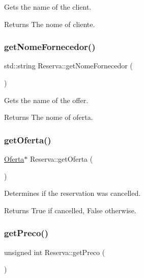 Gets the name of the client. 

\begin{DoxyReturn}{Returns}
The nome of cliente. 
\end{DoxyReturn}
\mbox{\label{classReserva_ad54ef5f67fa096e711d2ab526db30bf3}} 
\subsubsection{\texorpdfstring{get\+Nome\+Fornecedor()}{getNomeFornecedor()}}
{\footnotesize\ttfamily std\+::string Reserva\+::get\+Nome\+Fornecedor (\begin{DoxyParamCaption}{ }\end{DoxyParamCaption})\hspace{0.3cm}{\ttfamily [inline]}}



Gets the name of the offer. 

\begin{DoxyReturn}{Returns}
The nome of oferta. 
\end{DoxyReturn}
\mbox{\label{classReserva_ac7fb69d14f442f58961bd337267bd92d}} 
\subsubsection{\texorpdfstring{get\+Oferta()}{getOferta()}}
{\footnotesize\ttfamily \hyperlink{classOferta}{Oferta}$\ast$ Reserva\+::get\+Oferta (\begin{DoxyParamCaption}{ }\end{DoxyParamCaption})\hspace{0.3cm}{\ttfamily [inline]}}



Determines if the reservation was cancelled. 

\begin{DoxyReturn}{Returns}
True if cancelled, False otherwise. 
\end{DoxyReturn}
\mbox{\label{classReserva_a7d6a55cda46a28d62af5870c98cbc3d5}} 
\subsubsection{\texorpdfstring{get\+Preco()}{getPreco()}}
{\footnotesize\ttfamily unsigned int Reserva\+::get\+Preco (\begin{DoxyParamCaption}{ }\end{DoxyParamCaption})\hspace{0.3cm}{\ttfamily [inline]}}



